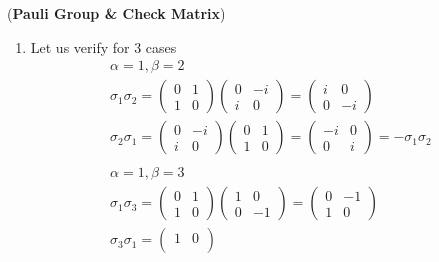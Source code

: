 \documentclass[a4paper,12pt]{article}
\begin{document}
\begin{large}(\textbf{Pauli Group \& Check Matrix})
\end{large}
\begin{enumerate}[label=(\alph*)]
    \item Let us verify for 3 cases
    \begin{gather*}
        \alpha = 1, \beta = 2\\
        \sigma_1\sigma_2 = \begin{pmatrix}
        0 & 1\\
        1 & 0
        \end{pmatrix}\begin{pmatrix}
        0 & -i\\
        i & 0
        \end{pmatrix} = \begin{pmatrix}
        i & 0\\
        0 & -i
        \end{pmatrix}\\
        \sigma_2\sigma_1 = \begin{pmatrix}
        0 & -i\\
        i & 0
        \end{pmatrix}\begin{pmatrix}
        0 & 1\\
        1 & 0
        \end{pmatrix}=\begin{pmatrix}
        -i & 0\\
        0 & i
        \end{pmatrix} = - \sigma_1\sigma_2\\~\\
        \alpha = 1, \beta = 3\\
        \sigma_1\sigma_3 = \begin{pmatrix}
        0 & 1\\
        1 & 0
        \end{pmatrix}\begin{pmatrix}
        1 & 0\\
        0 & -1
        \end{pmatrix} = \begin{pmatrix}
        0 & -1\\
        1 & 0
        \end{pmatrix}\\
        \sigma_3\sigma_1 = \begin{pmatrix}
        1 & 0\\

\end{pmatrix}
\end{gather*}
\end{enumerate}
\end{document}
